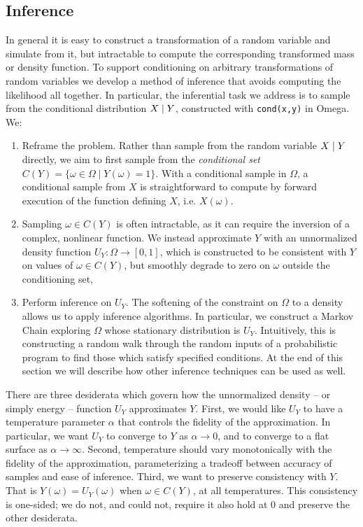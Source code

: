 \subsection{Inference}
In general it is easy to construct a transformation of a random variable 
and simulate from it, but intractable to compute the corresponding transformed mass or density function. 
To support conditioning on arbitrary transformations of random variables we develop a method of inference that avoids computing the likelihood all together.
In particular, the inferential task we address is to sample from the conditional distribution $X \mid Y$, constructed with \texttt{cond(x,y)} in Omega.
We:
\begin{enumerate}
	\item Reframe the problem. Rather than sample from the random variable $X \mid Y$ directly, we aim to first sample from the \emph{conditional set} $C(Y) = \{ \omega \in \Omega \mid Y(\omega) = 1 \}$. 
With a conditional sample in $\Omega$, a conditional sample from $X$ is straightforward to compute by forward execution of the function defining $X$, i.e. $X(\omega)$.
\item Sampling $\omega \in C(Y)$ is often intractable, as it can require the inversion of a complex, nonlinear function.
We instead approximate $Y$ with an unnormalized density function $U_Y: \Omega \to [0, 1]$, which is constructed to be consistent with $Y$ on values of $\omega \in C(Y)$, but smoothly degrade to zero on $\omega$ outside the conditioning set,  
\item Perform inference on $U_Y$.  The softening of the constraint on $\Omega$ to a density allows us to apply inference algorithms.  In particular, we construct a Markov Chain exploring $\Omega$ whose stationary distribution is $U_Y$.  Intuitively, this is constructing a random walk through the random inputs of a probabilistic program to find those which satisfy specified conditions. At the end of this section we will describe how other inference techniques can be used as well.
\end{enumerate}

There are three desiderata which govern how the unnormalized density -- or simply energy -- function  $U_Y$ approximates $Y$.  First, we would like $U_Y$ to have a temperature parameter $\alpha$ that controls the fidelity
of the approximation. In particular, we want $U_Y$ to converge to $Y$ as $\alpha \to 0$, and to converge to a flat surface as $\alpha \to \infty$. Second, temperature should vary monotonically with the fidelity of the approximation, parameterizing a tradeoff between accuracy of samples and ease of inference. Third, we want to preserve consistency with $Y$. That is $Y(\omega) = U_Y(\omega)$ when $\omega \in C(Y)$, at all temperatures.  This consistency is one-sided; we do not, and could not, require it also hold at 0 and preserve the other desiderata.

